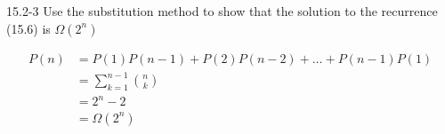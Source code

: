 

\usepackage{marginnote}




\homeworkheader{\classnameandsection}

\begin{problem}{15.2-3}
  Use the substitution method to show that the solution to the recurrence (15.6) is $\Omega(2^n)$
  \begin{solution}
    \begin{align*}
      P(n) &= P(1)P(n-1) + P(2)P(n-2) + \ldots + P(n-1)P(1) \\
           &= \displaystyle\sum\limits_{k = 1}^{n - 1} {n \choose k } \\
           &= 2^n - 2 \\
           &= \Omega(2^n)
    \end{align*}
  \end{solution}
\end{problem}

